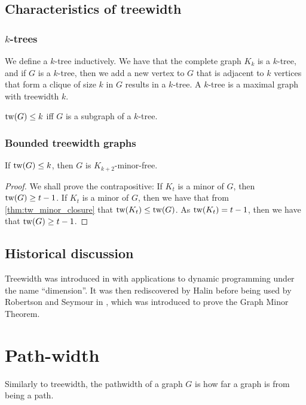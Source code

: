 \subsection{Characteristics of treewidth}\label{ssec:characterising_Treewidth}
\subsubsection{$k$-trees}\label{sssec:k-trees}
We define a $k$-tree inductively. We have that the complete graph $K_k$ is a $k$-tree, and if $G$ is a $k$-tree, then we add a new vertex to $G$ that is adjacent to $k$ vertices that form a clique of size $k$ in $G$ results in a $k$-tree. 
A $k$-tree is a maximal graph with treewidth $k$. 
\begin{theorem}
	$\text{tw}(G) \leq k$ iff $G$ is a subgraph of a $k$-tree. 
\end{theorem}


\subsubsection{Bounded treewidth graphs}\label{sssec:Graph_treewidth_Bounded}
\begin{theorem}\label{thm:treewidth_clique-minor-free}
	If $\text{tw}(G) \leq k$, then $G$ is $K_{k+2}$-minor-free. 
\end{theorem}
\begin{proof}
	We shall prove the contrapositive: If $K_t$ is a minor of $G$, then $\text{tw}(G) \geq t-1$.
	If $K_t$ is a minor of $G$, then we have that from \cref{thm:tw_minor_closure} that $\text{tw}(K_t) \leq \text{tw}(G)$. As $\text{tw}(K_t) = t-1$, then we have that $\text{tw}(G) \geq t - 1$. 
\end{proof}

\subsection{Historical discussion}\label{ssec:tw_historical}
Treewidth was introduced in \cite{berteleChapterEliminationVariables1972} with applications to dynamic programming under the name ``dimension''. It was then rediscovered by Halin \cite{halinSfunctionsGraphs1976} before being used by Robertson and Seymour in \cite{robertsonGraphMinorsIII1984}, which was introduced to prove the Graph Minor Theorem\cite{robertsonGraphMinorsXX2004}.


\section{Path-width}\label{sec:Pathwidth}
Similarly to treewidth, the pathwidth of a graph $G$ is how far a graph is from being a path. 

